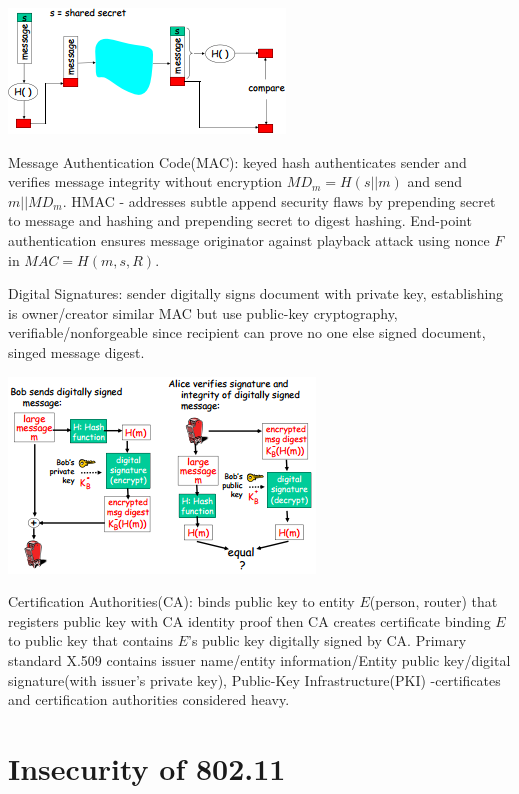 \documentclass[9pt]{extarticle}
\begin{document}
\begin{multicols}{2}
\includegraphics{mac.png}

Message Authentication Code(MAC): keyed hash authenticates sender and verifies message integrity without encryption $MD_m = H(s||m)$ and send $m||MD_m$. HMAC - addresses subtle append security flaws by prepending secret to message and hashing and prepending secret to digest hashing. End-point authentication ensures message originator against playback attack using nonce $F$ in $MAC=H(m,s,R)$.

Digital Signatures: sender digitally signs document with private key, establishing is owner/creator similar MAC but use public-key cryptography, verifiable/nonforgeable since recipient can prove no one else signed document, singed message digest.

\includegraphics{ds.png}

Certification Authorities(CA): binds public key to entity $E$(person, router) that registers public key with CA identity proof then CA creates certificate binding $E$ to public key that contains $E$'s public key digitally signed by CA. Primary standard X.509 contains issuer name/entity information/Entity public key/digital signature(with issuer’s private key), Public-Key Infrastructure(PKI) -certificates and certification authorities considered heavy.

\section{Insecurity of 802.11}


\end{multicols}
\end{document}
